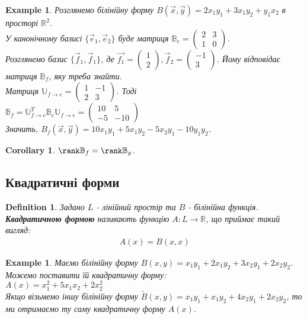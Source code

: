 \documentclass[a4paper, 10pt]{article}
\theoremstyle{theoremdd}
\newtheorem{definition}[theorem]{Definition}
\newtheorem{example}[theorem]{Example}
\newtheorem{corollary}[theorem]{Corollary}
\begin{document}
\begin{example}
Розглянемо білінійну форму $B(\vec{x},\vec{y}) = 2x_1y_1 + 3x_1y_2 + y_1x_2$ в просторі $\mathbb{R}^2$.\\
У канонічному базисі $\{\vec{e}_1,\vec{e}_2\}$ буде матриця $\mathbb{B}_e = \begin{pmatrix}
2 & 3 \\
1 & 0
\end{pmatrix}$.\\
Розглянемо базис $\{ \vec{f}_1, \vec{f}_1 \}$, де $\vec{f_1} = \begin{pmatrix}
1 \\ 2
\end{pmatrix}, \vec{f}_2 = \begin{pmatrix}
-1 \\ 3
\end{pmatrix}$. Йому відповідає матриця $\mathbb{B}_f$, яку треба знайти.\\
Матриця $\mathbb{U}_{f \to e} = \begin{pmatrix}
1 & -1 \\
2 & 3
\end{pmatrix}$. Тоді\\
$\mathbb{B}_f = \mathbb{U}^T_{f \to e} \mathbb{B}_e \mathbb{U}_{f \to e} = \begin{pmatrix}
10 & 5 \\
-5 & -10
\end{pmatrix}$\\
Значить, $B_f(\vec{x},\vec{y}) = 10x_1y_1 + 5x_1y_2 - 5x_2y_1 - 10y_1y_2$.
\end{example}

\begin{corollary}
$\rank \mathbb{B}_f = \rank \mathbb{B}_g$.
\end{corollary}

\subsection{Квадратичні форми}
\begin{definition}
Задано $L$ - лінійний простір та $B$ - білінійна функція.\\
\textbf{Квадратичною формою} називають функцію $A \colon L \to \mathbb{R}$, що приймає такий вигляд:
\begin{align*}
A(x) = B(x,x)
\end{align*}
\end{definition}

\begin{example}
Маємо білінійну форму $B(x,y) = x_1y_1 + 2x_1y_2 + 3x_2y_1 + 2x_2y_2$. Можемо поставити їй квадратичну форму:\\
$A(x) = x_1^2 + 5x_1x_2 + 2x_2^2$
\bigskip \\
Якщо візьмемо іншу білінійну форму $\widetilde{B}(x,y) = x_1y_1 + x_1y_2 + 4x_2y_1 + 2x_2y_2$, то ми отримаємо ту саму квадратичну форму $A(x)$.
\end{example}
\end{document}
